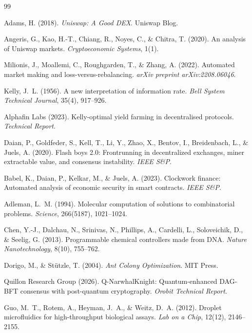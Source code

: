 \documentclass[12pt,a4paper]{article}
\begin{document}

\begin{thebibliography}{99}

Adams, H. (2018). \textit{Uniswap: A Good DEX}. Uniswap Blog.

Angeris, G., Kao, H.-T., Chiang, R., Noyes, C., \& Chitra, T. (2020).
An analysis of Uniswap markets.
\textit{Cryptoeconomic Systems}, 1(1).

Milionis, J., Moallemi, C., Roughgarden, T., \& Zhang, A. (2022).
Automated market making and loss-versus-rebalancing.
\textit{arXiv preprint arXiv:2208.06046}.

Kelly, J.~L. (1956).
A new interpretation of information rate.
\textit{Bell System Technical Journal}, 35(4), 917--926.

Alphafin Labs (2023).
Kelly-optimal yield farming in decentralised protocols.
\textit{Technical Report}.

Daian, P., Goldfeder, S., Kell, T., Li, Y., Zhao, X., Bentov, I.,
Breidenbach, L., \& Juels, A. (2020).
Flash boys 2.0: Frontrunning in decentralized exchanges, miner extractable
value, and consensus instability.
\textit{IEEE S\&P}.

Babel, K., Daian, P., Kelkar, M., \& Juels, A. (2023).
Clockwork finance: Automated analysis of economic security in smart contracts.
\textit{IEEE S\&P}.

Adleman, L.~M. (1994).
Molecular computation of solutions to combinatorial problems.
\textit{Science}, 266(5187), 1021--1024.

Chen, Y.-J., Dalchau, N., Srinivas, N., Phillips, A., Cardelli, L.,
Soloveichik, D., \& Seelig, G. (2013).
Programmable chemical controllers made from DNA.
\textit{Nature Nanotechnology}, 8(10), 755--762.

Dorigo, M., \& Stützle, T. (2004).
\textit{Ant Colony Optimization}. MIT Press.

Quillon Research Group (2026).
Q-NarwhalKnight: Quantum-enhanced DAG-BFT consensus with post-quantum cryptography.
\textit{Orobit Technical Report}.

Guo, M.~T., Rotem, A., Heyman, J.~A., \& Weitz, D.~A. (2012).
Droplet microfluidics for high-throughput biological assays.
\textit{Lab on a Chip}, 12(12), 2146--2155.

\end{thebibliography}
\end{document}
